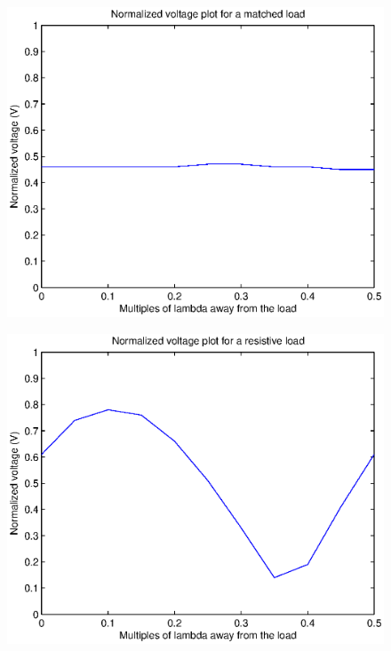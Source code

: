 \documentclass{article}
\begin{document}
\begin{figure}[H]
	\centering
   	\includegraphics[scale = 0.85]{./Matlab/Matched.eps}
\end{figure}
\begin{figure}[H]
	\centering
   	\includegraphics[scale = 0.85]{./Matlab/Resistive.eps}
\end{figure}
\end{document}
